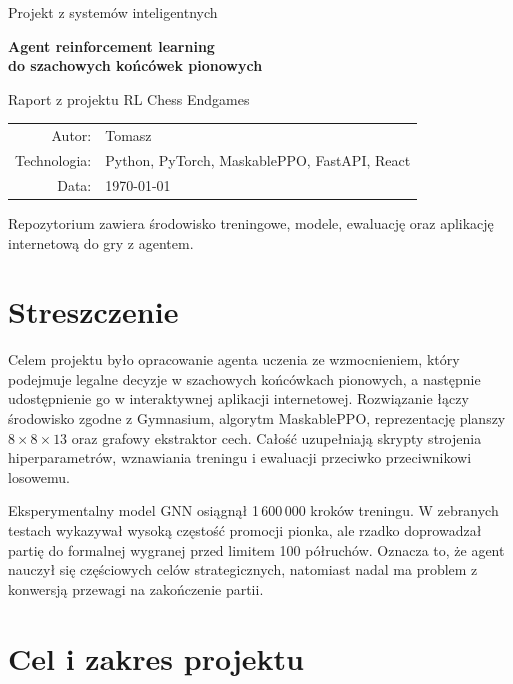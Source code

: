 \documentclass[12pt,a4paper]{article}
\newcommand{\projectname}{RL Chess Endgames}
\begin{document}
\begin{titlepage}
    \centering
    \vspace*{2cm}
    {\Large Projekt z systemów inteligentnych\par}
    \vspace{1.5cm}
    {\huge\bfseries Agent reinforcement learning\\
    do szachowych końcówek pionowych\par}
    \vspace{0.6cm}
    {\Large Raport z projektu \projectname\par}
    \vfill

    \begin{tabular}{rl}
        Autor: & Tomasz \\[0.3cm]
        Technologia: & Python, PyTorch, MaskablePPO, FastAPI, React \\[0.3cm]
        Data: & \today
    \end{tabular}

    \vfill
    {\large Repozytorium zawiera środowisko treningowe, modele, ewaluację
    oraz aplikację internetową do gry z agentem.\par}
\end{titlepage}

\tableofcontents
\newpage

\section{Streszczenie}

Celem projektu było opracowanie agenta uczenia ze wzmocnieniem, który podejmuje
legalne decyzje w szachowych końcówkach pionowych, a następnie udostępnienie go
w interaktywnej aplikacji internetowej. Rozwiązanie łączy środowisko zgodne z
Gymnasium, algorytm MaskablePPO, reprezentację planszy $8\times8\times13$ oraz
grafowy ekstraktor cech. Całość uzupełniają skrypty strojenia hiperparametrów,
wznawiania treningu i ewaluacji przeciwko przeciwnikowi losowemu.

Eksperymentalny model GNN osiągnął 1\,600\,000 kroków treningu. W zebranych
testach wykazywał wysoką częstość promocji pionka, ale rzadko doprowadzał partię
do formalnej wygranej przed limitem 100 półruchów. Oznacza to, że agent nauczył
się częściowych celów strategicznych, natomiast nadal ma problem z konwersją
przewagi na zakończenie partii.

\section{Cel i zakres projektu}
\end{document}

